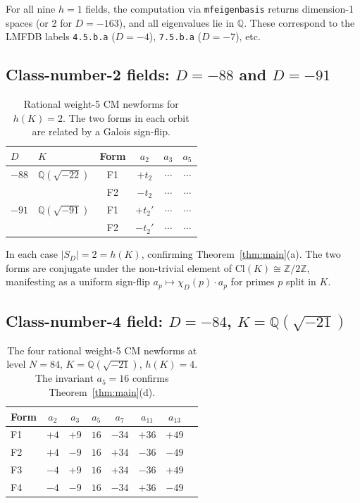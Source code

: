 \documentclass[12pt]{amsart}
\theoremstyle{definition}
\newcommand{\Q}{\mathbb{Q}}
\newcommand{\Z}{\mathbb{Z}}
\newcommand{\ClK}{\mathrm{Cl}(K)}
\begin{document}
For all nine $h = 1$ fields, the computation via \texttt{mfeigenbasis} returns
dimension-1 spaces (or 2 for $D = -163$), and all eigenvalues lie in $\Q$.
These correspond to the LMFDB labels \texttt{4.5.b.a} ($D=-4$),
\texttt{7.5.b.a} ($D=-7$), etc.

\subsection{Class-number-2 fields: $D = -88$ and $D = -91$}

\begin{table}[h]
\centering
\caption{Rational weight-5 CM newforms for $h(K) = 2$.
  The two forms in each orbit are related by a Galois sign-flip.}
\label{tab:h2}
\begin{tabular}{llcccc}
\toprule
$D$ & $K$ & Form & $a_2$ & $a_3$ & $a_5$ \\
\midrule
$-88$ & $\Q(\sqrt{-22})$ & F1 & $+t_2$ & $\cdots$ & $\cdots$ \\
      &                  & F2 & $-t_2$ & $\cdots$ & $\cdots$ \\
\midrule
$-91$ & $\Q(\sqrt{-91})$ & F1 & $+t_2'$ & $\cdots$ & $\cdots$ \\
      &                  & F2 & $-t_2'$ & $\cdots$ & $\cdots$ \\
\bottomrule
\end{tabular}
\end{table}

In each case $|S_D| = 2 = h(K)$, confirming Theorem~\ref{thm:main}(a).
The two forms are conjugate under the non-trivial element of $\ClK \cong \Z/2\Z$,
manifesting as a uniform sign-flip $a_p \mapsto \chi_D(p) \cdot a_p$
for primes $p$ split in $K$.

\subsection{Class-number-4 field: $D = -84$, $K = \Q(\sqrt{-21})$}

\begin{table}[h]
\centering
\caption{The four rational weight-5 CM newforms at level $N = 84$,
  $K = \Q(\sqrt{-21})$, $h(K) = 4$.  The invariant $a_5 = 16$ confirms
  Theorem~\ref{thm:main}(d).}
\label{tab:h4}
\begin{tabular}{lccccccc}
\toprule
Form & $a_2$ & $a_3$ & $a_5$ & $a_7$ & $a_{11}$ & $a_{13}$ \\
\midrule
F1 & $+4$  & $+9$  & $16$ & $-34$ & $+36$  & $+49$ \\
F2 & $+4$  & $-9$  & $16$ & $+34$ & $-36$  & $-49$ \\
F3 & $-4$  & $+9$  & $16$ & $+34$ & $-36$  & $+49$ \\
F4 & $-4$  & $-9$  & $16$ & $-34$ & $+36$  & $-49$ \\
\bottomrule
\end{tabular}
\end{table}
\end{document}
